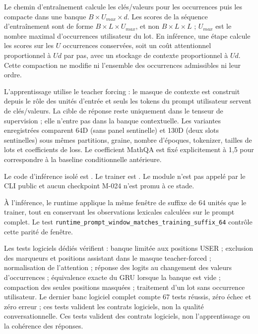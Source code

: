\documentclass[11pt,a4paper]{report}
\begin{document}
Le chemin d'entraînement calcule les clés/valeurs pour les occurrences puis les compacte dans une banque $B\times U_{max}\times d$. Les scores de la séquence d'entraînement sont de forme $B\times L\times U_{max}$, et non $B\times L\times L$ ; $U_{max}$ est le nombre maximal d'occurrences utilisateur du lot. En inférence, une étape calcule les scores sur les $U$ occurrences conservées, soit un coût attentionnel proportionnel à $U d$ par pas, avec un stockage de contexte proportionnel à $U d$. Cette compaction ne modifie ni l'ensemble des occurrences admissibles ni leur ordre.

L'apprentissage utilise le teacher forcing : le masque de contexte est construit depuis le rôle des unités d'entrée et seuls les tokens du prompt utilisateur servent de clés/valeurs. La cible de réponse reste uniquement dans le tenseur de supervision ; elle n'entre pas dans la banque contextuelle. Les variantes enregistrées comparent 64D (sans panel sentinelle) et 130D (deux slots sentinelles) sous mêmes partitions, graine, nombre d'époques, tokenizer, tailles de lots et coefficients de loss. Le coefficient MathQA est fixé explicitement à 1,5 pour correspondre à la baseline conditionnelle antérieure.

\begin{sloppypar}
Le code d'inférence isolé est . Le trainer est . Le module n'est pas appelé par le CLI public et aucun checkpoint M-024 n'est promu à ce stade.
\end{sloppypar}

À l’inférence, le runtime applique la même fenêtre de suffixe de 64 unités que le trainer, tout en conservant les observations lexicales calculées sur le prompt complet. Le test \texttt{runtime\_prompt\_window\_matches\_training\_suffix\_64} contrôle cette parité de fenêtre.

Les tests logiciels dédiés vérifient : banque limitée aux positions USER ; exclusion des marqueurs et positions assistant dans le masque teacher-forced ; normalisation de l'attention ; réponse des logits au changement des valeurs d'occurrences ; équivalence exacte du GRU lorsque la banque est vide ; compaction des seules positions masquées ; traitement d'un lot sans occurrence utilisateur. Le dernier banc logiciel complet compte 67 tests réussis, zéro échec et zéro erreur ; ces tests valident les contrats logiciels, non la qualité conversationnelle. Ces tests valident des contrats logiciels, non l'apprentissage ou la cohérence des réponses.
\end{document}
